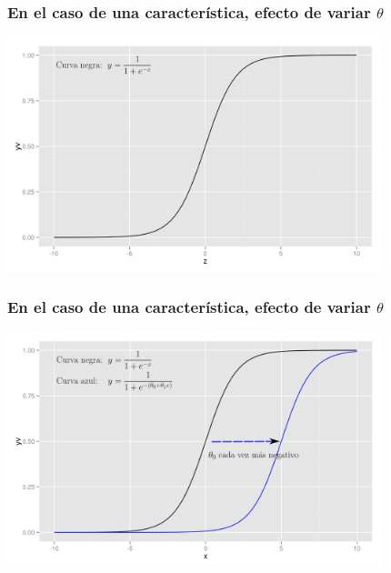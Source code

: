 \documentclass{beamer}
\begin{document}
 \begin{frame}\frametitle{En el caso de una característica, efecto de variar $\theta$}
 \begin{center} 
  \includegraphics[height=6.8cm]{sigmoidbare.png}
\end{center}
  \end{frame}
 \begin{frame}\frametitle{En el caso de una característica, efecto de variar $\theta$}
\begin{center}
  \includegraphics[height=6.8cm]{sigmoidtheta1-ink.png}
\end{center}
 \end{frame}
\end{document}
